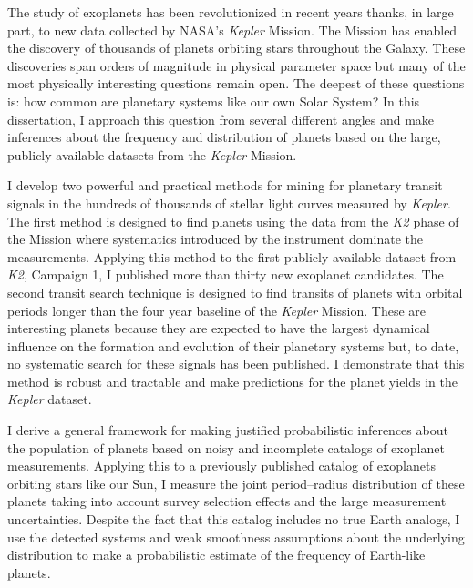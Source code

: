 The study of exoplanets has been revolutionized in recent years thanks, in
large part, to new data collected by NASA's \emph{Kepler} Mission.
The Mission has enabled the discovery of thousands of planets orbiting stars
throughout the Galaxy.
These discoveries span orders of magnitude in physical parameter space but
many of the most physically interesting questions remain open.
The deepest of these questions is: how common are planetary systems like our
own Solar System?
In this dissertation, I approach this question from several different angles
and make inferences about the frequency and distribution of planets based on
the large, publicly-available datasets from the \emph{Kepler} Mission.

I develop two powerful and practical methods for mining for planetary transit
signals in the hundreds of thousands of stellar light curves measured by
\emph{Kepler}.
The first method is designed to find planets using the data from the
\emph{K2} phase of the Mission where systematics introduced by the instrument
dominate the measurements.
Applying this method to the first publicly available dataset from \emph{K2},
Campaign 1, I published more than thirty new exoplanet candidates.
The second transit search technique is designed to find transits of planets
with orbital periods longer than the four year baseline of the \emph{Kepler}
Mission.
These are interesting planets because they are expected to have the largest
dynamical influence on the formation and evolution of their planetary systems
but, to date, no systematic search for these signals has been published.
I demonstrate that this method is robust and tractable and make predictions
for the planet yields in the \emph{Kepler} dataset.

I derive a general framework for making justified probabilistic inferences
about the population of planets based on noisy and incomplete catalogs of
exoplanet measurements.
Applying this to a previously published catalog of exoplanets orbiting stars
like our Sun, I measure the joint period--radius distribution of these
planets taking into account survey selection effects and the large
measurement uncertainties.
Despite the fact that this catalog includes no true Earth analogs, I use the
detected systems and weak smoothness assumptions about the underlying
distribution to make a probabilistic estimate of the frequency of Earth-like
planets.
